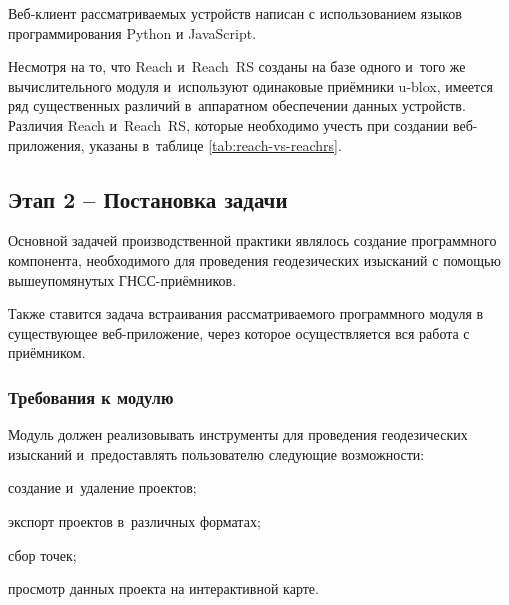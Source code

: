 \documentclass[pta]{../../../../scs-iam}
\begin{document}
Веб-клиент рассматриваемых устройств написан с использованием языков программирования Python и JavaScript.

\newpage

Несмотря на то, что Reach и~Reach~RS созданы на базе одного и~того же вычислительного модуля и~используют одинаковые приёмники u-blox, имеется ряд существенных различий в~аппаратном обеспечении данных устройств. Различия Reach и~Reach~RS, которые необходимо учесть при создании веб-приложения, указаны в~таблице \ref{tab:reach-vs-reachrs}.


\subsection{Этап 2 -- Постановка задачи}

Основной задачей производственной практики являлось создание программного компонента, необходимого для проведения геодезических изысканий с помощью вышеупомянутых ГНСС-приёмников.

Также ставится задача встраивания рассматриваемого программного модуля в существующее веб-приложение, через которое осуществляется вся работа с приёмником.

\subsubsection{Требования к модулю}
\label{subsec:survey-requirements}

Модуль должен реализовывать инструменты для проведения геодезических изысканий и~предоставлять пользователю следующие возможности:
\begin{dashitemize}
  \item создание и~удаление проектов;
  \item экспорт проектов в~различных форматах;
  \item сбор точек;
  \item просмотр данных проекта на интерактивной карте.
\end{dashitemize}
\end{document}

